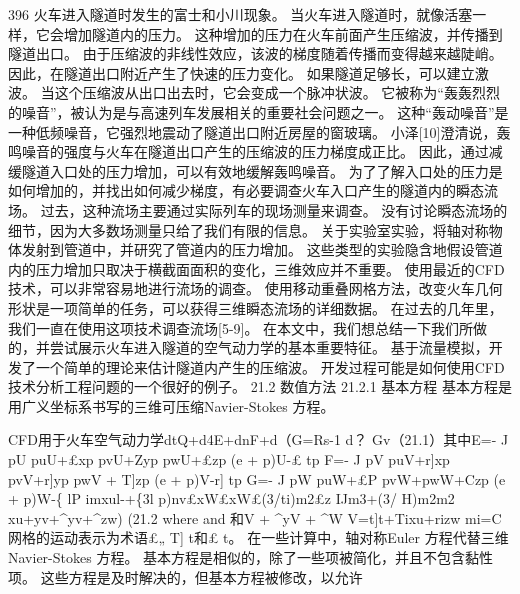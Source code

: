 \documentclass[UTF8,11pt,a4paper,openany,fontset=fandol]{ctexbook}
\begin{document}
396 火车进入隧道时发生的富士和小川现象。 当火车进入隧道时，就像活塞一样，它会增加隧道内的压力。 这种增加的压力在火车前面产生压缩波，并传播到隧道出口。 由于压缩波的非线性效应，该波的梯度随着传播而变得越来越陡峭。 因此，在隧道出口附近产生了快速的压力变化。 如果隧道足够长，可以建立激波。 当这个压缩波从出口出去时，它会变成一个脉冲状波。 它被称为“轰轰烈烈的噪音”，被认为是与高速列车发展相关的重要社会问题之一。 这种“轰动噪音”是一种低频噪音，它强烈地震动了隧道出口附近房屋的窗玻璃。 小泽[10]澄清说，轰鸣噪音的强度与火车在隧道出口产生的压缩波的压力梯度成正比。 因此，通过减缓隧道入口处的压力增加，可以有效地缓解轰鸣噪音。 为了了解入口处的压力是如何增加的，并找出如何减少梯度，有必要调查火车入口产生的隧道内的瞬态流场。 过去，这种流场主要通过实际列车的现场测量来调查。 没有讨论瞬态流场的细节，因为大多数场测量只给了我们有限的信息。 关于实验室实验，将轴对称物体发射到管道中，并研究了管道内的压力增加。 这些类型的实验隐含地假设管道内的压力增加只取决于横截面面积的变化，三维效应并不重要。 使用最近的CFD技术，可以非常容易地进行流场的调查。 使用移动重叠网格方法，改变火车几何形状是一项简单的任务，可以获得三维瞬态流场的详细数据。 在过去的几年里，我们一直在使用这项技术调查流场[5-9]。 在本文中，我们想总结一下我们所做的，并尝试展示火车进入隧道的空气动力学的基本重要特征。 基于流量模拟，开发了一个简单的理论来估计隧道内产生的压缩波。 开发过程可能是如何使用CFD技术分析工程问题的一个很好的例子。 21.2 数值方法 21.2.1 基本方程 基本方程是用广义坐标系书写的三维可压缩Navier-Stokes 方程。

CFD用于火车空气动力学dtQ+d4E+dnF+d（G=Rs-1 d？ Gv（21.1）其中E=- J pU puU+£xp pvU+Zyp pwU+£zp (e + p)U-£ tp F=- J pV puV+r]xp pvV+r]yp pwV + T]zp (e + p)V-r] tp G=- J pW puW+£P pvW+pwW+Czp (e + p)W-\{ lP imxul-+\{3l p)nv£xW£xW£(3/ti)m2£z IJm3+(3/ H)m2m2 xu+yv+\textasciicircum{}yv+\textasciicircum{}zw) (21.2 where and 和V + \textasciicircum{}yV + \textasciicircum{}W V=t]t+Tixu+rizw mi=C 网格的运动表示为术语£„ T] t和£ t。 在一些计算中，轴对称Euler 方程代替三维Navier-Stokes 方程。 基本方程是相似的，除了一些项被简化，并且不包含黏性项。 这些方程是及时解决的，但基本方程被修改，以允许
\end{document}
